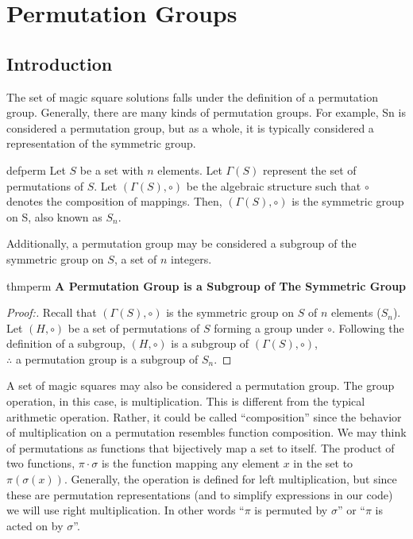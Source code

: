 \documentclass[12pt]{report}
\begin{document}
\chapter{Permutation Groups}

\section{Introduction}

\par The set of magic square solutions falls under the definition of a permutation group.
Generally, there are many kinds of permutation groups. For example, Sn is considered a permutation
group, but as a whole, it is typically considered a representation of the symmetric group.

\singlespacing{}
\begin{defbox}{}{defperm}
  Let $S$ be a set with $n$ elements. Let $\varGamma\left(S\right)$ represent the set of
  permutations of $S$. Let $\left(\varGamma\left(S\right), \circ \right)$ be the algebraic
  structure
  such that $\circ$ denotes the composition of mappings. Then, $\left(\varGamma\left(S\right),
    \circ
    \right)$ is the symmetric group on S, also known as $S_n$.
\end{defbox}
\doublespacing{}

\par Additionally, a permutation group may be considered a subgroup of the symmetric group on $S$,
a set of $n$ integers.

\singlespacing{}
\begin{thmbox}{}{thmperm}
  \textbf{A Permutation Group is a Subgroup of The Symmetric Group}
  \begin{proof}[Proof:]
    Recall that $\left(\varGamma\left(S\right), \circ \right)$ is the symmetric group on $S$ of $n$
    elements ($S_n$). Let $\left(H,\circ\right)$ be a set of permutations of $S$ forming a group
    under
    $\circ$. Following the definition of a subgroup, $\left(H,\circ\right)$ is a subgroup of
    $\left(\varGamma\left(S\right), \circ \right)$,\\ $\therefore$ a permutation group is a
    subgroup of
    $S_n$.
  \end{proof}
\end{thmbox}
\doublespacing{}

\par A set of magic squares may also be considered a permutation group. The group operation, in
this case, is multiplication. This is different from the typical arithmetic operation. Rather, it
could be called “composition” since the behavior of multiplication on a permutation resembles
function composition. We may think of permutations as functions that bijectively map a set to
itself. The product of two functions, $\pi\cdot\sigma$ is the function mapping any element $x$ in
the set to $\pi\left(\sigma\left(x\right)\right)$. Generally, the operation is defined for left
multiplication, but since these are permutation representations (and to simplify expressions in our
code) we will use right multiplication. In other words ``$\pi$ is permuted by $\sigma$'' or ``$\pi$
is acted on by $\sigma$''.
\end{document}
